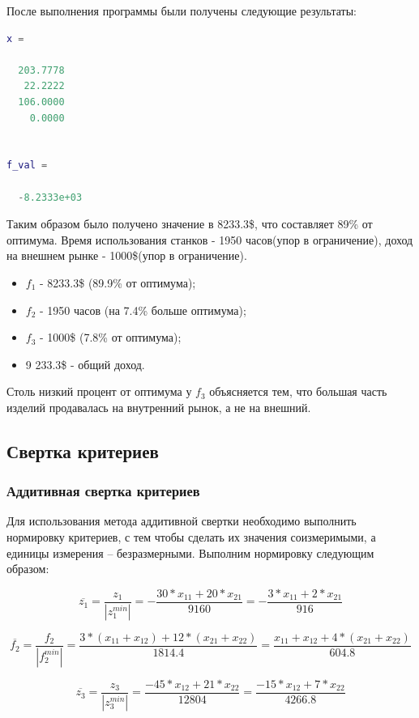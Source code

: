 После выполнения программы были получены следующие результаты:
\begin{lstlisting}[language={matlab}, caption={Результаты выполнения листинга \ref{lst:2}}]
x =

  203.7778
   22.2222
  106.0000
    0.0000


f_val =

  -8.2333e+03
\end{lstlisting}
Таким образом было получено значение в 8233.3\$, что составляет 89\% от оптимума. 
Время использования станков - 1950 часов(упор в ограничение), доход на внешнем рынке - 1000\$(упор в ограничение).
\begin{itemize}
\item $f_1$ - 8233.3\$ (89.9\% от оптимума);
\item $f_2$ - 1950 часов (на 7.4\% больше оптимума);
\item $f_3$ - 1000\$ (7.8\% от оптимума);
\item 9 233.3\$ - общий доход.
\end{itemize}
Столь низкий процент от оптимума у $f_3$ объясняется тем, что большая часть изделий продавалась на внутренний рынок, а не на внешний.


\subsection{Свертка критериев}
\subsubsection{Аддитивная свертка критериев}
Для использования метода аддитивной свертки необходимо выполнить нормировку критериев, с тем чтобы сделать их значения соизмеримыми, а единицы измерения – безразмерными. Выполним нормировку следующим образом:



\begin{equation}
\overline{z_1} = \frac{z_1}{|z_1^{min}|} =-\frac{30*x_{11}+20*x_{21}}{9160} = -\frac{3*x_{11}+2*x_{21}}{916} 
\end{equation}

\begin{equation}
\overline{f_2} = \frac{f_2}{|f_2^{min}|} = \frac{3*(x_{11}+x_{12})+12*(x_{21}+x_{22})}{1814.4}  = \frac{x_{11}+x_{12}+4*(x_{21}+x_{22})}{604.8}  
\end{equation}

\begin{equation}
\overline{z_3} = \frac{z_3}{|z_3^{min}|} = \frac{-45*x_{12}+21*x_{22}}{12804} =   \frac{-15*x_{12}+7*x_{22}}{4266.8}
\end{equation}

